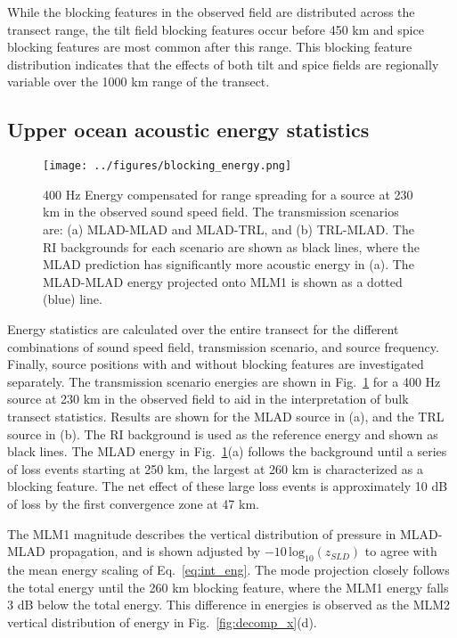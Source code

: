 \documentclass[preprint,NumberedRefs]{JASA}
\begin{document}
While the blocking features in the observed field are distributed across the transect range, the tilt field blocking features occur before 450 km and spice blocking features are most common after this range. This blocking feature distribution indicates that the effects of both tilt and spice fields are regionally variable over the 1000 km range of the transect.

\subsection{Upper ocean acoustic energy statistics}\label{ssec:energy}
\begin{figure}
\texttt{[image: ../figures/blocking\_energy.png]}
    \caption{400 Hz Energy compensated for range spreading for a source at 230 km in the observed sound speed field. The transmission scenarios are: (a) MLAD-MLAD and MLAD-TRL, and (b) TRL-MLAD. The RI backgrounds for each scenario are shown as black lines, where the MLAD prediction has significantly more acoustic energy in (a). The MLAD-MLAD energy projected onto MLM1 is shown as a dotted (blue) line.}
    \label{fig:ml_energy}
\end{figure}
Energy statistics are calculated over the entire transect for the different combinations of sound speed field, transmission scenario, and source frequency. Finally, source positions with and without blocking features are investigated separately. The transmission scenario energies are shown in Fig.~\ref{fig:ml_energy} for a 400 Hz source at 230 km in the observed field to aid in the interpretation of bulk transect statistics. Results are shown for the MLAD source in (a), and the TRL source in (b). The RI background is used as the reference energy and shown as black lines. The MLAD energy in Fig.~\ref{fig:ml_energy}(a) follows the background until a series of loss events starting at 250 km, the largest at 260 km is characterized as a blocking feature. The net effect of these large loss events is approximately 10 dB of loss by the first convergence zone at 47 km.

The MLM1 magnitude describes the vertical distribution of pressure in MLAD-MLAD propagation, and is shown adjusted by $-10 \, \textrm{log}_{10}(z_{SLD})$ to agree with the mean energy scaling of Eq.~\eqref{eq:int_eng}. The mode projection closely follows the total energy until the 260 km blocking feature, where the MLM1 energy falls 3 dB below the total energy. This difference in energies is observed as the MLM2 vertical distribution of energy in Fig.~\ref{fig:decomp_x}(d).
\end{document}
